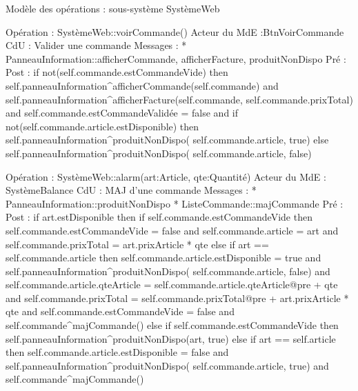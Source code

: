Modèle des opérations : sous-système SystèmeWeb






Opération : SystèmeWeb::voirCommande()
Acteur du MdE :BtnVoirCommande
CdU : Valider une commande
Messages : 
* PanneauInformation::{afficherCommande, afficherFacture, produitNonDispo}
Pré :
Post : 
        if not(self.commande.estCommandeVide) then
                self.panneauInformation^afficherCommande(self.commande) 
and
                self.panneauInformation^afficherFacture(self.commande, 
self.commande.prixTotal) 
and
                self.commande.estCommandeValidée = false 
and
                if not(self.commande.article.estDisponible) then
                        self.panneauInformation^produitNonDispo( self.commande.article, true)
                else
                        self.panneauInformation^produitNonDispo( self.commande.article, false)




Opération : SystèmeWeb::alarm(art:Article, qte:Quantité)
Acteur du MdE : SystèmeBalance
CdU : MAJ d’une commande
Messages :
* PanneauInformation::{produitNonDispo} 
* ListeCommande::{majCommande}
Pré :
Post :  
        if art.estDisponible then
                if self.commande.estCommandeVide then
                        self.commande.estCommandeVide = false 
and
self.commande.article = art 
and
self.commande.prixTotal = art.prixArticle * qte
                else
                        if art == self.commande.article then 
                                self.commande.article.estDisponible = true 
and 
                                self.panneauInformation^produitNonDispo( 
self.commande.article, false) 
and
                                self.commande.article.qteArticle = 
self.commande.article.qteArticle@pre + qte
                        and
self.commande.prixTotal = self.commande.prixTotal@pre + 
art.prixArticle * qte
                        and
                        self.commande.estCommandeVide = false
                and
                self.commande^majCommande()
        else
                if self.commande.estCommandeVide then
                        self.panneauInformation^produitNonDispo(art, true)
                else
if art == self.article then 
        self.commande.article.estDisponible = false 
and
                                self.panneauInformation^produitNonDispo(
self.commande.article, true)
                and
                self.commande^majCommande()
        


